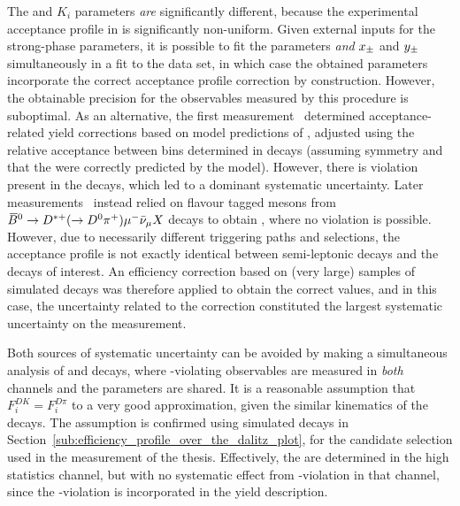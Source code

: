 The \Fi and $K_i$ parameters \emph{are} significantly different, because the experimental acceptance profile in \lhcb is significantly non-uniform.  Given external inputs for the strong-phase parameters, it is possible to fit the \Fi parameters \emph{and} $x_\pm$ and $y_\pm$ simultaneously in a fit to the \lhcb \BtoDK data set, in which case the obtained \Fi parameters incorporate the correct acceptance profile correction by construction. However, the obtainable precision for the \CP observables measured by this procedure is suboptimal. As an alternative, the first \lhcb measurement~\cite{LHCb-PAPER-2012-027} determined acceptance-related yield corrections based on model predictions of \Ki, adjusted using the relative acceptance between bins determined in \BtoDpi decays (assuming \CP symmetry and that the \Ki were correctly predicted by the model). 
However, there is \CP violation present in the \BtoDpi decays, which led to a dominant systematic uncertainty. Later \lhcb measurements~\cite{LHCb-PAPER-2014-041,LHCb-PAPER-2018-017} instead relied on flavour tagged \D mesons from ${{\kern 0.18em\overline{\kern -0.18em B}}{}^0}\rightarrow{\ensuremath{{D}^{*+}}}(\rightarrow {\ensuremath{{D}^0}} {\ensuremath{{\pi}^+}})\mu^- \bar \nu_\mu X$ decays to obtain \Fi, where no \CP violation is possible. However, due to necessarily different triggering paths and selections, the acceptance profile is not exactly identical between semi-leptonic decays and the \BtoDh decays of interest. An efficiency correction based on (very large) samples of simulated decays was therefore applied to obtain the correct \Fi values, and in this case,  the uncertainty related to the correction constituted the largest systematic uncertainty on the measurement.

Both sources of systematic uncertainty can be avoided by making a simultaneous analysis of \BtoDK and \BtoDpi decays, where \CP-violating observables are measured in \emph{both} channels and the \Fi parameters are shared. It is a reasonable assumption that $F_i^{DK}=F_i^{D\pi}$ to a very good approximation, given the similar kinematics of the decays. The assumption is confirmed using simulated decays in Section~\ref{sub:efficiency_profile_over_the_dalitz_plot}, for the candidate selection used in the measurement of the thesis. Effectively, the \Fi are determined in the high statistics \BtoDpi channel, but with no systematic effect from \CP-violation in that channel, since the \CP-violation is incorporated in the yield description. 


